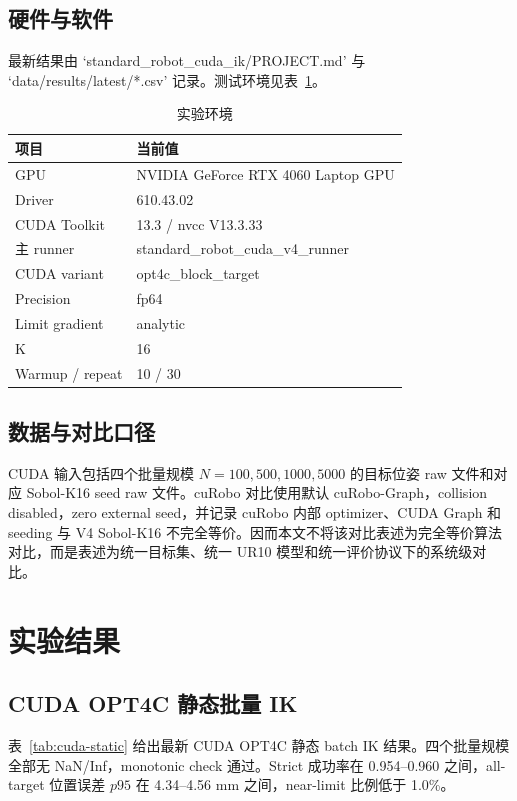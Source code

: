 \documentclass[twocolumn,a4paper,10pt]{ctexart}
\begin{document}
\subsection{硬件与软件}

最新结果由 `standard\_robot\_cuda\_ik/PROJECT.md' 与 `data/results/latest/*.csv' 记录。测试环境见表~\ref{tab:env}。

\begin{table}[ht]
\centering
\caption{实验环境}
\label{tab:env}
\small
\begin{tabular}{ll}
\toprule
项目 & 当前值\\
\midrule
GPU & NVIDIA GeForce RTX 4060 Laptop GPU\\
Driver & 610.43.02\\
CUDA Toolkit & 13.3 / nvcc V13.3.33\\
主 runner & standard\_robot\_cuda\_v4\_runner\\
CUDA variant & opt4c\_block\_target\\
Precision & fp64\\
Limit gradient & analytic\\
K & 16\\
Warmup / repeat & 10 / 30\\
\bottomrule
\end{tabular}
\end{table}

\subsection{数据与对比口径}

CUDA 输入包括四个批量规模 $N=100,500,1000,5000$ 的目标位姿 raw 文件和对应 Sobol-K16 seed raw 文件。cuRobo 对比使用默认 cuRobo-Graph，collision disabled，zero external seed，并记录 cuRobo 内部 optimizer、CUDA Graph 和 seeding 与 V4 Sobol-K16 不完全等价。因而本文不将该对比表述为完全等价算法对比，而是表述为统一目标集、统一 UR10 模型和统一评价协议下的系统级对比。

\section{实验结果}

\subsection{CUDA OPT4C 静态批量 IK}

表~\ref{tab:cuda-static} 给出最新 CUDA OPT4C 静态 batch IK 结果。四个批量规模全部无 NaN/Inf，monotonic check 通过。Strict 成功率在 0.954--0.960 之间，all-target 位置误差 $p95$ 在 4.34--4.56 mm 之间，near-limit 比例低于 1.0\%。
\end{document}
